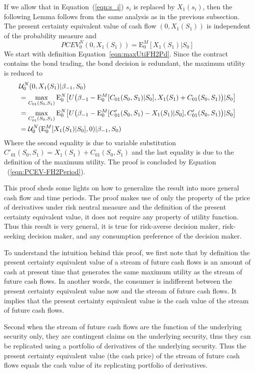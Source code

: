 \documentclass{article}[12pt letter]
\newcommand{\E}{\mathrm{E}}
\begin{document}
If we allow that in Equation~(\ref{eqn:s_i}) $s_i$ is replaced by $X_1(s_i)$, then the following Lemma follows from the same analysis as in the previous subsection. 
{\lemma The present certainty equivalent value of cash flow $(0,X_1(S_1))$ is independent of the probability measure and 
\[PCEV_0^N(0,X_1(S_1)) = \E_0^M[X_1(S_1)|S_0] \]
}
\proof We start with definition Equation~\ref{eqn:maxUtiFH2Pd}. Since the contract contains the bond trading, the bond decision is redundant, the maximum utility is reduced to 
\begin{align*}
    &\mathcal{U}^N_0(0, X_{1}(S_1)|\beta_{-1},S_0) \nonumber \\
    & = \max_{ C_{01}(S_0,S_1)} \E_0^N \big{[}U\big{(}\beta_{-1}-\E_0^M[C_{01}(S_0,S_1)|S_0],   X_1(S_1)+ C_{01}(S_0,S_1) \big{)}|S_0 \big{]} \\
    & = \max_{ C'_{01}(S_0,S_1)} \E_0^N \big{[}U\big{(}\beta_{-1}-\E_0^M[C'_{01}(S_0,S_1)-X_1(S_1) |S_0],   C'_{01}(S_0,S_1) \big{)}|S_0 \big{]} \\
    & = \mathcal{U}^N_0(\E_0^M[ X_{1}(S_1)|S_0], 0)|\beta_{-1},S_0)
\end{align*}
Where the second equality is due to variable substitution $C'_{01}(S_0,S_1) = X_1(S_1) + C_{01}(S_0,S_1)$ and the last equality is due to the definition of the maximum utility. The proof is concluded by Equation 
~(\ref{eqn:PCEV-FH2Period}). 
\endproof

This proof sheds some lights on how to generalize the result into more general cash flow and time periods. The proof makes use of only the property of the price of derivatives under risk neutral measure and the definition of the present certainty equivalent value, it does not require any property of utility function. Thus this result is very general, it is true for risk-averse decision maker, risk-seeking decision maker, and any consumption preference of the decision maker. 

To understand the intuition behind this proof, we first note that by definition the present certainty equivalent value of a stream of future cash flows is an amount of cash at present time that generates the same maximum utility as the stream of future cash flows. In another words, the consumer is indifferent between the present certainty equivalent value now and the stream of future cash flows. It implies that the present certainty equivalent value is the cash value of the stream of future cash flows. 

Second when the stream of future cash flows are the function of the underlying security only, they are contingent claims on the underlying security, thus they can be replicated using a portfolio of derivatives of the underlying  security. Thus the present certainty equivalent value (the cash price) of the stream of future cash flows equals the cash value of its replicating portfolio of derivatives. 
\end{document}
